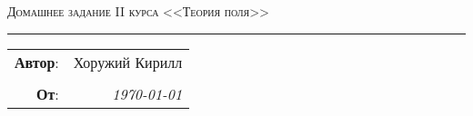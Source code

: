 
\begin{center}
    \LARGE \textsc{Домашнее задание II курса <<Теория поля>>}
\end{center}

\hrule

\phantom{42}

\begin{flushright}
    \begin{tabular}{rr}
        \textbf{Автор}: 
        & Хоружий Кирилл \\
        &\\
        \textbf{От}: &
        \textit{\today}\\
    \end{tabular}
\end{flushright}

\thispagestyle{empty}
\tableofcontents
\newpage
